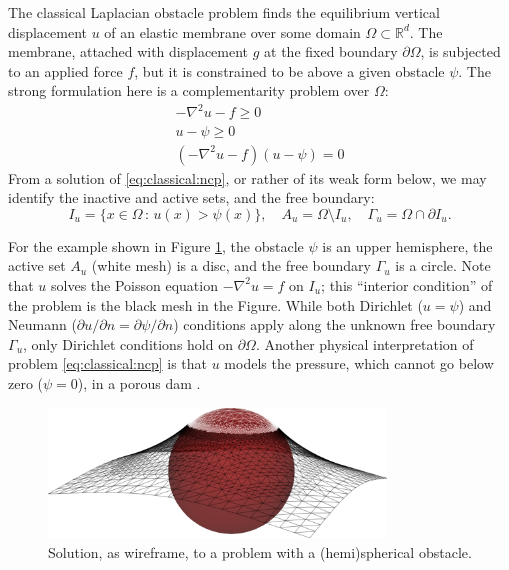 \documentclass[]{interact}
\theoremstyle{plain}%
\theoremstyle{definition}
\theoremstyle{remark}
\newcommand{\RR}{\mathbb{R}}
\begin{document}
The classical Laplacian obstacle problem \cite{KinderlehrerStampacchia1980} finds the equilibrium vertical displacement $u$ of an elastic membrane over some domain $\Omega \subset \RR^d$.  The membrane, attached with displacement $g$ at the fixed boundary $\partial\Omega$, is subjected to an applied force $f$, but it is constrained to be above a given obstacle $\psi$.  The strong formulation here is a complementarity problem over $\Omega$:
\begin{subequations} \label{eq:classical:ncp}
\begin{align}
  -\nabla^2 u - f \geq 0 \label{eq:classical:ncp:a} \\
  u - \psi \geq 0\\
  (-\nabla^2u - f)(u - \psi) = 0 \label{eq:classical:ncp:c}
\end{align}
\end{subequations}
From a solution of \eqref{eq:classical:ncp}, or rather of its weak form below, we may identify the inactive and active sets, and the free boundary:
\begin{equation}
  I_u = \{x \in \Omega \,:\, u(x) > \psi(x)\}, \quad A_u = \Omega \setminus I_u, \quad \Gamma_u = \Omega \cap \partial I_u. \label{eq:classical:sets}
\end{equation}

For the example shown in Figure \ref{fig:ball}, the obstacle $\psi$ is an upper hemisphere, the active set $A_u$ (white mesh) is a disc, and the free boundary $\Gamma_u$ is a circle.  Note that $u$ solves the Poisson equation $-\nabla^2u = f$ on $I_u$; this ``interior condition'' of the problem is the black mesh in the Figure.  While both Dirichlet ($u=\psi$) and Neumann ($\partial u/\partial n = \partial \psi/\partial n$) conditions apply along the unknown free boundary $\Gamma_u$, only Dirichlet conditions hold on $\partial\Omega$.  Another physical interpretation of problem \eqref{eq:classical:ncp} is that $u$ models the pressure, which cannot go below zero ($\psi=0$), in a porous dam \cite[for example]{AinsworthOdenLee1993}.

\begin{figure}[H]
\centering
\includegraphics[width=0.8\textwidth]{static/obstacle.png}
\caption{Solution, as wireframe, to a problem with a (hemi)spherical obstacle.}
\label{fig:ball}
\end{figure}
\end{document}
